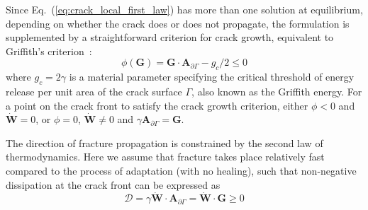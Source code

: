 \documentclass[review]{elsarticle}
\numberwithin{equation}{section}
\begin{document}
%
%

Since Eq.~(\ref{eq:crack_local_first_law}) has more than one solution at equilibrium, depending on whether the crack 
does or does not propagate, the formulation is supplemented by a straightforward criterion for crack growth, equivalent to Griffith's  criterion~\citep{kaczmarczyk2017energy}:
\begin{equation} \label{eq:grif1}
\phi(\mathbf{G}) = 
\mathbf{G} \cdot \mathbf{A}_{\partial\Gamma} - g_c/2 \leq 0
\end{equation} 
where $g_c=2\gamma$ is a material parameter specifying the critical threshold of energy release
per unit area of the crack surface $\Gamma$, also known as the Griffith energy. For a point on the crack front to satisfy the crack growth criterion, 
either $\phi<0$ and $\dot{\mathbf{W}}=0$, or $\phi=0$, $\dot{\mathbf{W}}\ne 0$ and $\gamma\mathbf{A}_{\partial\Gamma}=\mathbf{G}$. 



The direction of fracture propagation is
constrained by the second law of thermodynamics. Here we assume that fracture takes place
relatively fast compared to the process of adaptation (with no healing), 
such that non-negative dissipation at the crack front can be expressed as
\begin{equation}
	\mathcal{D} = \gamma \dot{\mathbf{W}} \cdot \mathbf{A}_{\partial\Gamma}= \dot{\mathbf{W}} \cdot \mathbf{G}\ge0
\end{equation}
\end{document}
